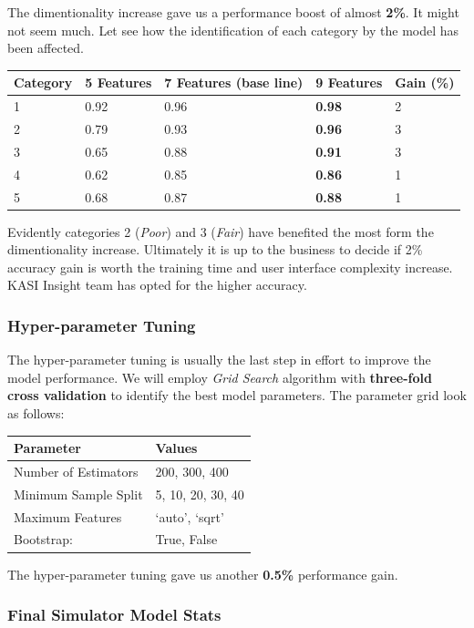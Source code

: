 The dimentionality increase gave us a performance boost of almost
\textbf{2\%}. It might not seem much. Let see how the identification of
each category by the model has been affected.

\begin{longtable}[]{@{}lllll@{}}
\toprule
Category & 5 Features & 7 Features (base line) & \textbf{9 Features} &
Gain (\%)\tabularnewline
\midrule
\endhead
1 & 0.92 & 0.96 & \textbf{0.98} & 2\tabularnewline
2 & 0.79 & 0.93 & \textbf{0.96} & 3\tabularnewline
3 & 0.65 & 0.88 & \textbf{0.91} & 3\tabularnewline
4 & 0.62 & 0.85 & \textbf{0.86} & 1\tabularnewline
5 & 0.68 & 0.87 & \textbf{0.88} & 1\tabularnewline
\bottomrule
\end{longtable}

Evidently categories 2 (\emph{Poor}) and 3 (\emph{Fair}) have benefited
the most form the dimentionality increase. Ultimately it is up to the
business to decide if 2\% accuracy gain is worth the training time and
user interface complexity increase. KASI Insight team has opted for the
higher accuracy.

\hypertarget{hyper-parameter-tuning}{%
\subsubsection{Hyper-parameter Tuning}\label{hyper-parameter-tuning}}

The hyper-parameter tuning is usually the last step in effort to improve
the model performance. We will employ \emph{Grid Search} algorithm with
\textbf{three-fold cross validation} to identify the best model
parameters. The parameter grid look as follows:

\begin{longtable}[]{@{}ll@{}}
\toprule
Parameter & Values\tabularnewline
\midrule
\endhead
Number of Estimators & 200, 300, 400\tabularnewline
Minimum Sample Split & 5, 10, 20, 30, 40\tabularnewline
Maximum Features & `auto', `sqrt'\tabularnewline
Bootstrap: & True, False\tabularnewline
\bottomrule
\end{longtable}

The hyper-parameter tuning gave us another \textbf{0.5\%} performance
gain.

\hypertarget{final-simulator-model-stats}{%
\subsubsection{Final Simulator Model
Stats}\label{final-simulator-model-stats}}

